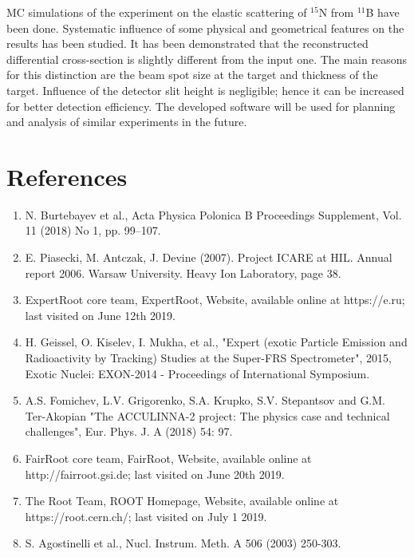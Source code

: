 \documentclass[%
 aip,
cp,  %
 amsmath,amssymb,%
 reprint,%
]{revtex4-2}
\begin{document}
MC simulations of the experiment on the elastic scattering of ${}^{15}$N  from ${}^{11}$B have been done. Systematic influence of some physical and geometrical features on the results has been studied. It has been demonstrated that the reconstructed differential cross-section is slightly different from the input one. The main reasons for this distinction are the beam spot size at the target and thickness of the target. Influence of the detector slit height is negligible; hence it can be increased for better detection efficiency. The developed software will be used for planning and analysis of similar experiments in the future.

\section{References}

\begin{enumerate}
\item N. Burtebayev et al., Acta Physica Polonica B Proceedings Supplement, Vol. 11 (2018) No 1, pp. 99–107.
\item E. Piasecki, M. Antczak, J. Devine (2007). Project ICARE at HIL. Annual report 2006. Warsaw University. Heavy       Ion Laboratory, page 38.
\item ExpertRoot core team, ExpertRoot, Website, available online at https://e.ru; last visited on June 12th 2019.
\item H. Geissel, O. Kiselev, I. Mukha, et al., "Expert (exotic Particle Emission and Radioactivity by Tracking) Studies at the Super-FRS Spectrometer", 2015, Exotic Nuclei: EXON-2014 - Proceedings of International Symposium.
\item A.S. Fomichev, L.V. Grigorenko, S.A. Krupko, S.V. Stepantsov and G.M. Ter-Akopian "The ACCULINNA-2 project: The physics case and technical challenges", Eur. Phys. J. A (2018) 54: 97.
\item FairRoot core team, FairRoot, Website, available online at http://fairroot.gsi.de; last visited on June 20th 2019.
\item The Root Team, ROOT Homepage, Website, available online at https://root.cern.ch/; last visited on July 1 2019.
\item S. Agostinelli et al., Nucl. Instrum. Meth. A 506 (2003) 250-303.

\end{enumerate}
\end{document}
